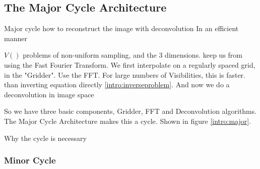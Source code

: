 \subsection{The Major Cycle Architecture}
Major cycle how to reconstruct the image with deconvolution
In an efficient manner

$V()$ problems of non-uniform sampling, and the 3 dimensions. keep us from using the Fast Fourier Transform.
We first interpolate on a regularly spaced grid, in the "Gridder".
Use the FFT. For large numbers of Visibilities, this is faster. than inverting equation directly \eqref{intro:inverseproblem}.
And now we do a deconvolution in image space

So we have three basic components, Gridder, FFT and Deconvolution algorithms.
The Major Cycle Architecture makes this a cycle.
Shown in figure \ref{intro:major}.



Why the cycle is necessary



\subsubsection{Minor Cycle}


